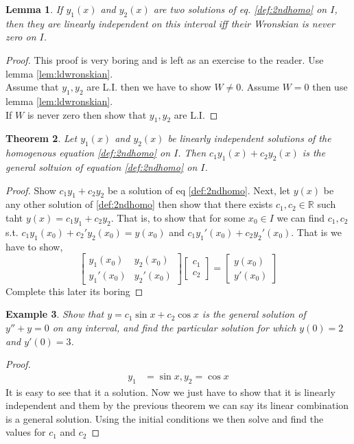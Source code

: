 \documentclass[oneside,11pt,pdftex,final]{book}%
\numberwithin{equation}{section}
\newtheorem{theorem}{Theorem}[chapter]%
\newtheorem{lemma}[theorem]{Lemma}
\newtheorem{example}[theorem]{Example}
\numberwithin{section}{chapter}
\numberwithin{equation}{chapter}
\newcommand{\R}{\mathbb{R}}
\begin{document}
\begin{lemma}
	If $ y_1(x) $ and $ y_2(x) $ are two solutions of eq. \ref{def:2ndhomo} on $ I $, then they are linearly independent on this interval iff their Wronskian is never zero on $ I $.
\end{lemma}
\begin{proof}
	This proof is very boring and is left as an exercise to the reader. Use lemma \ref{lem:ldwronskian}.\\
	Assume that $ y_1, y_2 $ are L.I. then we have to show $ W \neq 0 $. Assume $ W=0 $ then use lemma \ref{lem:ldwronskian}.\\
	If $ W $ is never zero then show that $ y_1, y_2 $ are L.I.
\end{proof}

\begin{theorem}
	Let $ y_1(x) $ and $ y_2(x) $ be linearly independent solutions of the homogenous equation \ref{def:2ndhomo} on $ I $. Then $ c_1 y_1(x) + c_2 y_2 (x)$ is the general soltuion of equation \ref{def:2ndhomo} on $ I $.
\end{theorem}
\begin{proof}
	Show $ c_1 y_1+c_2y_2 $ be a solution of eq \ref{def:2ndhomo}. Next, let $ y(x) $ be any other solution of \ref{def:2ndhomo} then show that there exists $ c_1, c_2 \in \R $ such taht $ y(x)=c_1y_1+c_2y_2 $. That is, to show that for some $ x_0 \in I $ we can find $ c_1, c_2 $ s.t. $ c_1 y_1(x_0) +c_2'y_2(x_0)=y(x_0)$ and $ c_1y_1'(x_0)+c_2y_2'(x_0) $.
	That is we have to show,
	\[ \begin{bmatrix}
	y_1(x_0)	& y_2(x_0)\\ 
	y_1'(x_0)	& y_2'(x_0) 
	\end{bmatrix} \begin{bmatrix}
	c_1 \\ c_2
\end{bmatrix}=\begin{bmatrix}
y(x_0)\\ y'(x_0)
\end{bmatrix} \]
Complete this later its boring
\end{proof}

\begin{example}
	Show that $ y=c_1 \sin x + c_2 \cos x $ is the general solution of $ y''+y=0 $ on any interval, and find the particular solution for which $ y(0)=2 $ and $ y'(0)=3$.
\end{example}
\begin{proof}
	\begin{align*}
		y_1&=\sin x, y_2= \cos x
	\end{align*}
It is easy to see that it a solution. Now we just have to show that it is linearly independent and them by the previous theorem we can say its linear combination is a general solution. Using the initial conditions we then solve and find the values for $ c_1 $ and $ c_2 $
\end{proof}
\end{document}
